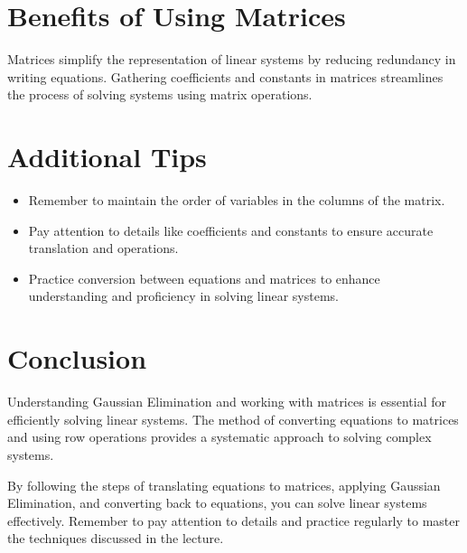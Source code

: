 \documentclass{article}
\begin{document}
\section{Benefits of Using Matrices}
Matrices simplify the representation of linear systems by reducing redundancy in writing equations. Gathering coefficients and constants in matrices streamlines the process of solving systems using matrix operations.

\section{Additional Tips}
\begin{itemize}
  \item Remember to maintain the order of variables in the columns of the matrix.
  \item Pay attention to details like coefficients and constants to ensure accurate translation and operations.
  \item Practice conversion between equations and matrices to enhance understanding and proficiency in solving linear systems.
\end{itemize}

\section{Conclusion}
Understanding Gaussian Elimination and working with matrices is essential for efficiently solving linear systems. The method of converting equations to matrices and using row operations provides a systematic approach to solving complex systems.

By following the steps of translating equations to matrices, applying Gaussian Elimination, and converting back to equations, you can solve linear systems effectively. Remember to pay attention to details and practice regularly to master the techniques discussed in the lecture.
\end{document}

